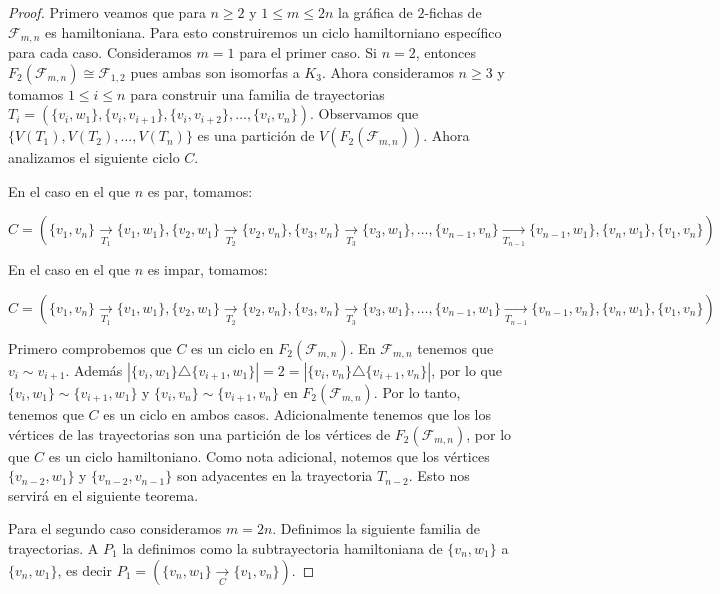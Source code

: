 \begin{proof}
    Primero veamos que para $n \geq 2$ y $1 \leq m \leq 2n$ la gr\'afica de
    $2$-fichas de $\mathcal{F}_{m,n}$ es hamiltoniana. Para esto construiremos
    un ciclo hamiltorniano espec\'ifico para cada caso. Consideramos $m=1$ para
    el primer caso. Si $n=2$, entonces $F_2(\mathcal{F}_{m,n}) \cong
    \mathcal{F}_{1,2}$ pues ambas son isomorfas a $K_3$. Ahora consideramos $n
    \geq 3$ y tomamos $1 \leq i \leq n$ para construir una familia de
    trayectorias $T_i=(\{v_i,w_1\},\{v_i,v_{i+1}\},\{v_i,v_{i+2}\},\dots,
    \{v_i,v_n\})$. Observamos que $\{V(T_1),V(T_2),\dots, V(T_n)\}$ es una
    partici\'on de $V(F_2(\mathcal{F}_{m,n}))$. %
    Ahora analizamos el siguiente ciclo $C$.
    
    En el caso en el que $n$ es par, tomamos:

    $C=(\{v_1,v_n\} \xrightarrow[T_1]{}\{v_1,w_1\},\{v_2,w_1\}
    \xrightarrow[T_2]{}\{v_2,v_n\},\{v_3,v_n\} \xrightarrow[T_3]{}\{v_3,w_1\},
    \dots, \{v_{n-1},v_n\}
    \xrightarrow[T_{n-1}]{}\{v_{n-1},w_1\},\{v_n,w_1\},\{v_1,v_n\})$

    En el caso en el que $n$ es impar, tomamos:

    $C=(\{v_1,v_n\} \xrightarrow[T_1]{}\{v_1,w_1\},\{v_2,w_1\}
    \xrightarrow[T_2]{}\{v_2,v_n\},\{v_3,v_n\} \xrightarrow[T_3]{}\{v_3,w_1\},
    \dots, \{v_{n-1},w_1\}
    \xrightarrow[T_{n-1}]{}\{v_{n-1},v_n\},\{v_n,w_1\},\{v_1,v_n\})$

    Primero comprobemos que $C$ es un ciclo en $F_2(\mathcal{F}_{m,n})$. En $\mathcal{F}_{m,n}$
    tenemos que $v_i \sim v_{i+1}$. Adem\'as $|\{v_i,w_1\}\triangle
    \{v_{i+1},w_1\}|=2 =|\{v_i,v_n\}\triangle \{v_{i+1},v_n\}|$, por lo que
    $\{v_i,w_1\}\sim \{v_{i+1},w_1\}$ y $\{v_i,v_n\}\sim \{v_{i+1},v_n\}$ en
    $F_2(\mathcal{F}_{m,n})$. Por lo tanto, tenemos que $C$ es un ciclo en ambos casos.
    Adicionalmente tenemos que los los v\'ertices de las trayectorias son una
    partici\'on de los v\'ertices de $F_2(\mathcal{F}_{m,n})$, por lo que $C$ es un ciclo
    hamiltoniano. Como nota adicional, notemos que los v\'ertices
    $\{v_{n-2},w_1\}$ y $\{v_{n-2},v_{n-1}\}$ son adyacentes en la trayectoria
    $T_{n-2}$. Esto nos servir\'a en el siguiente teorema.

    Para el segundo caso consideramos $m=2n$. Definimos la siguiente familia de
    trayectorias. A $P_1$ la definimos como la subtrayectoria hamiltoniana de
    $\{v_n,w_1\}$ a $\{v_n,w_1\}$, es decir $P_1= (\{v_n,w_1\}
    \xrightarrow[C]{}\{v_1,v_n\})$. 
    

\end{proof}
